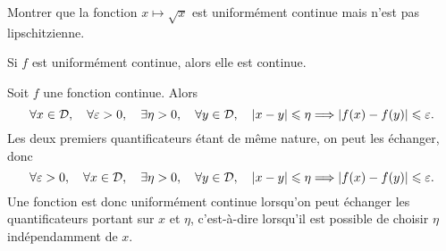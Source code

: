 \documentclass{magnolia}
\begin{document}
\begin{exoUnique}
\exo Montrer que la fonction $x\mapsto\sqrt{x}$ est uniformément continue
  mais n'est pas lipschitzienne.
\end{exoUnique}

\begin{proposition}[utile=-3]
Si $f$ est uniformément continue, alors elle est continue.
\end{proposition}

\begin{remarqueUnique}
\remarque Soit $f$ une fonction continue. Alors
  \[\forall x\in\mathcal{D} ,\quad \forall \varepsilon>0 ,\quad \exists \eta>0
    ,\quad \forall y\in\mathcal{D} ,\quad \left|x-y\right|\leqslant\eta \Longrightarrow
    \left|f(x)-f(y)\right|\leqslant\varepsilon.\]
  Les deux premiers quantificateurs étant de même nature, on peut les échanger,
  donc
  \[\forall \varepsilon>0 ,\quad \forall x\in\mathcal{D} ,\quad \exists \eta>0
    ,\quad \forall y\in\mathcal{D} ,\quad \left|x-y\right|\leqslant\eta \Longrightarrow
    \left|f(x)-f(y)\right|\leqslant\varepsilon.\]
  Une fonction est donc uniformément continue lorsqu'on peut échanger les
  quantificateurs portant sur $x$ et $\eta$, c'est-à-dire lorsqu'il est
  possible de choisir $\eta$ indépendamment de $x$.
\end{remarqueUnique}
\end{document}
